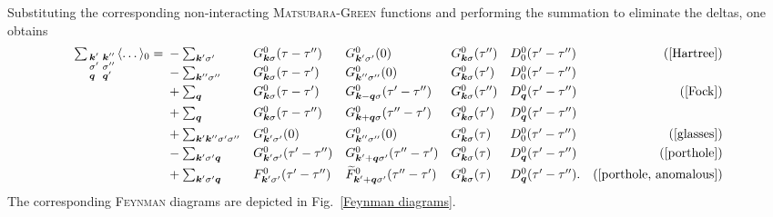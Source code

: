 Substituting the corresponding non-interacting \textsc{Matsubara-Green}
functions and performing the summation to eliminate the  deltas,
one obtains
%
\begin{align*}
    \sum_{\smash[b]{\begin{smallmatrix*}[l]
        \vec k' & \vec k'' \\
        \sigma' & \sigma'' \\
        \vec q & \vec q'
    \end{smallmatrix*}}}
    \av \dots_0 =
    \let\displaystyle\textstyle
    \begin{aligned}[t]
        &- \sum_{\vec k' \sigma'}
        && G^0_{\vec k \sigma}(\tau - \tau'')
        && G^0_{\vec k' \sigma'}(0)
        && G^0_{\vec k \sigma}(\tau'')
        && D^0_0(\tau' - \tau'')
        &  \text{(\ref{Hartree})} \\
        &- \sum_{\vec k'' \sigma''}
        && G^0_{\vec k \sigma}(\tau - \tau')
        && G^0_{\vec k'' \sigma''}(0)
        && G^0_{\vec k \sigma}(\tau')
        && D^0_0(\tau' - \tau'')
        &  \\
        &+ \sum_{\vec q}
        && G^0_{\vec k \sigma}(\tau - \tau')
        && G^0_{\vec k - \vec q \sigma}(\tau' - \tau'')
        && G^0_{\vec k \sigma}(\tau'')
        && D^0_{\vec q}(\tau' - \tau'')
        &  \text{(\ref{Fock})} \\
        &+ \sum_{\vec q}
        && G^0_{\vec k \sigma}(\tau - \tau'')
        && G^0_{\vec k + \vec q \sigma}(\tau'' - \tau')
        && G^0_{\vec k \sigma}(\tau')
        && D^0_{\vec q}(\tau' - \tau'')
        &  \\
        &+ \textstyle \sum_{\vec k' \vec k'' \sigma' \sigma''}
        && G^0_{\vec k' \sigma'}(0)
        && G^0_{\vec k'' \sigma''}(0)
        && G^0_{\vec k \sigma}(\tau)
        && D^0_0(\tau' - \tau'')
        &  \text{(\ref{glasses})} \\
        &- \sum_{\vec k' \sigma' \vec q}
        && G^0_{\vec k' \sigma'}(\tau' - \tau'')
        && G^0_{\vec k' + \vec q \sigma'}(\tau'' - \tau')
        && G^0_{\vec k \sigma}(\tau)
        && D^0_{\vec q}(\tau' - \tau'')
        &  \text{(\ref{porthole})} \\
        &+ \sum_{\vec k' \sigma' \vec q}
        && F^0_{\vec k' \sigma'}(\tau' - \tau'')
        && \smash{\widetilde F^0_{\vec k' + \vec q \sigma'}}(\tau'' - \tau')
        && G^0_{\vec k \sigma}(\tau)
        && D^0_{\vec q}(\tau' - \tau'').
        &  \text{(\ref{porthole, anomalous})}
    \end{aligned}
\end{align*}
%
The corresponding \textsc{Feynman} diagrams are depicted in Fig.~\ref{Feynman
diagrams}.

